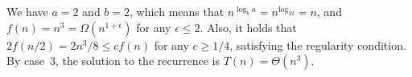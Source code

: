 We have $a=2$ and $b=2$, which means that $n^{\log_ba}=n^{\log_22}=n$, and $f(n)=n^3=\Omega(n^{1+\epsilon})$ for any $\epsilon\le2$.
Also, it holds that $2f(n/2)=2n^3\!/8\le cf(n)$ for any $c\ge1/4$, satisfying the regularity condition.
By case~3, the solution to the recurrence is $T(n)=\Theta(n^3)$.
